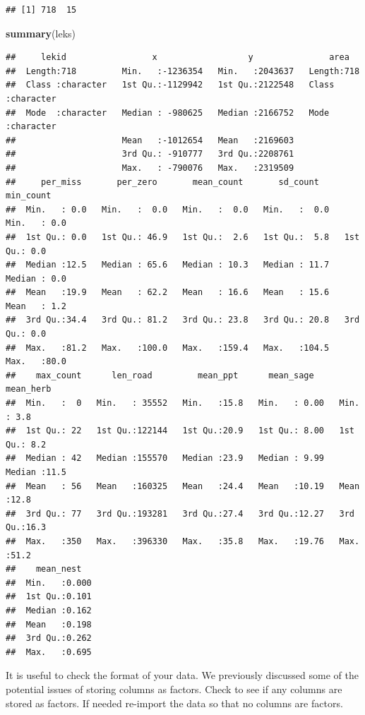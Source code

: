 \documentclass[
]{book}
\newenvironment{Shaded}{\begin{snugshade}}{\end{snugshade}}
\newcommand{\FunctionTok}[1]{\textcolor[rgb]{0.13,0.29,0.53}{\textbf{#1}}}
\newcommand{\NormalTok}[1]{#1}
\begin{document}
\begin{verbatim}
## [1] 718  15
\end{verbatim}

\begin{Shaded}
\begin{Highlighting}[]
\FunctionTok{summary}\NormalTok{(leks)}
\end{Highlighting}
\end{Shaded}

\begin{verbatim}
##     lekid                 x                  y               area          
##  Length:718         Min.   :-1236354   Min.   :2043637   Length:718        
##  Class :character   1st Qu.:-1129942   1st Qu.:2122548   Class :character  
##  Mode  :character   Median : -980625   Median :2166752   Mode  :character  
##                     Mean   :-1012654   Mean   :2169603                     
##                     3rd Qu.: -910777   3rd Qu.:2208761                     
##                     Max.   : -790076   Max.   :2319509                     
##     per_miss       per_zero       mean_count       sd_count       min_count   
##  Min.   : 0.0   Min.   :  0.0   Min.   :  0.0   Min.   :  0.0   Min.   : 0.0  
##  1st Qu.: 0.0   1st Qu.: 46.9   1st Qu.:  2.6   1st Qu.:  5.8   1st Qu.: 0.0  
##  Median :12.5   Median : 65.6   Median : 10.3   Median : 11.7   Median : 0.0  
##  Mean   :19.9   Mean   : 62.2   Mean   : 16.6   Mean   : 15.6   Mean   : 1.2  
##  3rd Qu.:34.4   3rd Qu.: 81.2   3rd Qu.: 23.8   3rd Qu.: 20.8   3rd Qu.: 0.0  
##  Max.   :81.2   Max.   :100.0   Max.   :159.4   Max.   :104.5   Max.   :80.0  
##    max_count      len_road         mean_ppt      mean_sage       mean_herb   
##  Min.   :  0   Min.   : 35552   Min.   :15.8   Min.   : 0.00   Min.   : 3.8  
##  1st Qu.: 22   1st Qu.:122144   1st Qu.:20.9   1st Qu.: 8.00   1st Qu.: 8.2  
##  Median : 42   Median :155570   Median :23.9   Median : 9.99   Median :11.5  
##  Mean   : 56   Mean   :160325   Mean   :24.4   Mean   :10.19   Mean   :12.8  
##  3rd Qu.: 77   3rd Qu.:193281   3rd Qu.:27.4   3rd Qu.:12.27   3rd Qu.:16.3  
##  Max.   :350   Max.   :396330   Max.   :35.8   Max.   :19.76   Max.   :51.2  
##    mean_nest    
##  Min.   :0.000  
##  1st Qu.:0.101  
##  Median :0.162  
##  Mean   :0.198  
##  3rd Qu.:0.262  
##  Max.   :0.695
\end{verbatim}

It is useful to check the format of your data. We previously discussed some of the potential issues of storing columns as factors. Check to see if any columns are stored as factors. If needed re-import the data so that no columns are factors.
\end{document}
